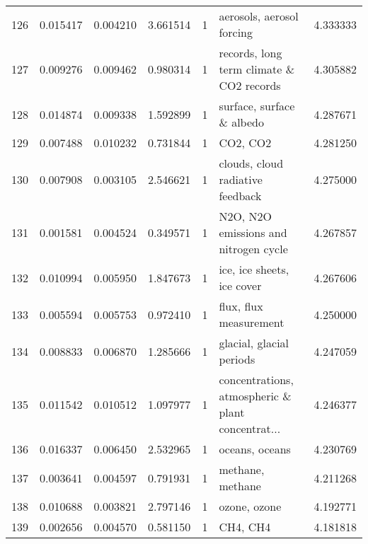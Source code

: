 \begin{tabular}{lrrrrlr}
126 &    0.015417 &  0.004210 &        3.661514 &           1 &                          aerosols, aerosol forcing &  4.333333 \\
127 &    0.009276 &  0.009462 &        0.980314 &           1 &           records, long term climate \& CO2 records &  4.305882 \\
128 &    0.014874 &  0.009338 &        1.592899 &           1 &                          surface, surface \& albedo &  4.287671 \\
129 &    0.007488 &  0.010232 &        0.731844 &           1 &                                           CO2, CO2 &  4.281250 \\
130 &    0.007908 &  0.003105 &        2.546621 &           1 &                   clouds, cloud radiative feedback &  4.275000 \\
131 &    0.001581 &  0.004524 &        0.349571 &           1 &              N2O, N2O emissions and nitrogen cycle &  4.267857 \\
132 &    0.010994 &  0.005950 &        1.847673 &           1 &                         ice, ice sheets, ice cover &  4.267606 \\
133 &    0.005594 &  0.005753 &        0.972410 &           1 &                             flux, flux measurement &  4.250000 \\
134 &    0.008833 &  0.006870 &        1.285666 &           1 &                           glacial, glacial periods &  4.247059 \\
135 &    0.011542 &  0.010512 &        1.097977 &           1 &  concentrations, atmospheric \& plant concentrat... &  4.246377 \\
136 &    0.016337 &  0.006450 &        2.532965 &           1 &                                     oceans, oceans &  4.230769 \\
137 &    0.003641 &  0.004597 &        0.791931 &           1 &                                   methane, methane &  4.211268 \\
138 &    0.010688 &  0.003821 &        2.797146 &           1 &                                       ozone, ozone &  4.192771 \\
139 &    0.002656 &  0.004570 &        0.581150 &           1 &                                           CH4, CH4 &  4.181818 \\
\bottomrule
\end{tabular}
